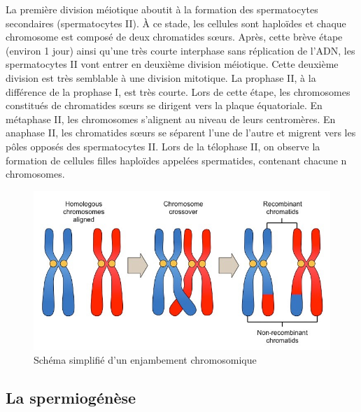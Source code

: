 \documentclass[12pt,twoside]{reedthesis}
\theoremstyle{definition}
\theoremstyle{definition}
\theoremstyle{remark}
\begin{document}
  La première division méiotique aboutit à la formation des spermatocytes
  secondaires (spermatocytes II). À ce stade, les cellules sont haploïdes
  et chaque chromosome est composé de deux chromatides sœurs. Après, cette
  brève étape (environ 1 jour) ainsi qu'une très courte interphase sans
  réplication de l'ADN, les spermatocytes II vont entrer en deuxième
  division méiotique. Cette deuxième division est très semblable à une
  division mitotique. La prophase II, à la différence de la prophase I,
  est très courte. Lors de cette étape, les chromosomes constitués de
  chromatides sœurs se dirigent vers la plaque équatoriale. En métaphase
  II, les chromosomes s'alignent au niveau de leurs centromères. En
  anaphase II, les chromatides sœurs se séparent l'une de l'autre et
  migrent vers les pôles opposés des spermatocytes II. Lors de la
  télophase II, on observe la formation de cellules filles haploïdes
  appelées spermatides, contenant chacune n chromosomes.
  
  \begin{figure}
  
  {\centering \includegraphics[scale=0.35]{figure/crossingover} 
  
  }
  
  \caption{Schéma simplifié d'un enjambement chromosomique}\label{fig:crossingover}
  \end{figure}
  
  \hypertarget{spermiogenese}{\subsection{La
  spermiogénèse}\label{spermiogenese}}
  
\end{document}

